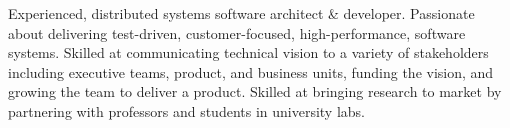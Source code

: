 \documentclass[10pt,a4paper,ragged2e,withhyper]{altacv}
\begin{document}


\makecvheader

Experienced, distributed systems software architect \& developer. Passionate about delivering test-driven, customer-focused, high-performance, software systems. Skilled at communicating technical vision to a variety of stakeholders including executive teams, product, and business units, funding the vision, and growing the team to deliver a product. Skilled at bringing research to market by partnering with professors and students in university labs.


\end{document}
